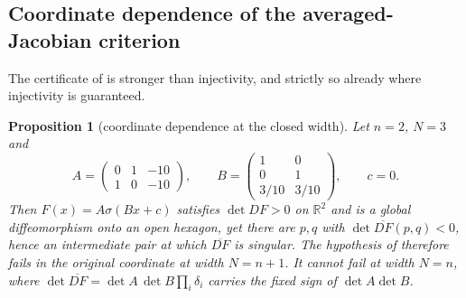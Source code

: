 \documentclass[11pt,twoside,leqno]{article}
\theoremstyle{plain}
\newtheorem{proposition}[proposition]{Proposition}
\theoremstyle{definition}
\theoremstyle{remark}
\newcommand{\R}{\mathbb{R}}
\begin{document}
\subsection{Coordinate dependence of the averaged-Jacobian criterion}

The certificate of  is stronger than injectivity, and strictly so
already where injectivity is guaranteed.

\begin{proposition}[coordinate dependence at the closed width]\label{prop:coorddep}
Let $n=2$, $N=3$ and
\[
 A=\begin{pmatrix} 0 & 1 & -10\\ 1 & 0 & -10\end{pmatrix},\qquad
 B=\begin{pmatrix} 1 & 0\\ 0 & 1\\ 3/10 & 3/10\end{pmatrix},\qquad c=0 .
\]
Then $F(x)=A\sigma(Bx+c)$ satisfies $\det DF>0$ on $\R^2$ and is a global
diffeomorphism onto an open hexagon, yet there are $p,q$ with
$\det\overline{DF}(p,q)<0$, hence an intermediate pair at which
$\overline{DF}$ is singular.  The hypothesis of  therefore fails
in the original coordinate at width $N=n+1$.  It cannot fail at width $N=n$,
where $\det\overline{DF}=\det A\,\det B\prod_i\delta_i$ carries the fixed sign
of $\det A\det B$.
\end{proposition}
\end{document}
